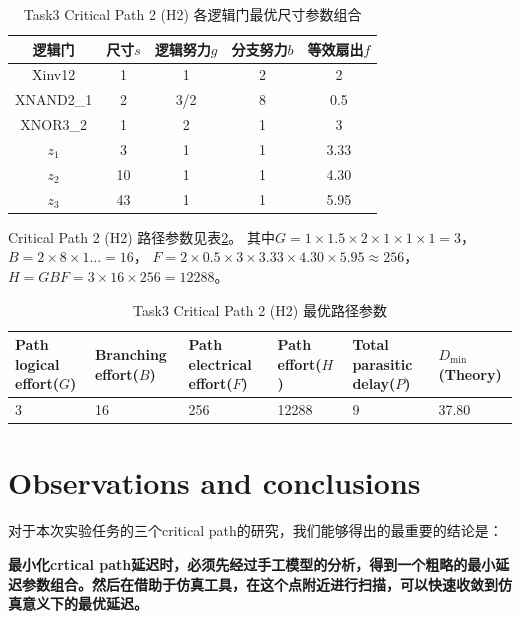 \documentclass[UTF8,12pt,a4paper]{ctexart}
\begin{document}
\begin{table}[htbp]
\centering
\caption{Task3 Critical Path 2 (H2) 各逻辑门最优尺寸参数组合}
\label{tab:task3_h2_best_gate_params}
\begin{tabular}{ccccc}
\toprule
逻辑门 & 尺寸$s$ & 逻辑努力$g$ & 分支努力$b$ & 等效扇出$f$ \\
\midrule
Xinv12    & 1 & 1 & 2 & 2 \\
XNAND2\_1 & 2 & 3/2 & 8 & 0.5 \\
XNOR3\_2  & 1 & 2 & 1 & 3 \\
$z_1$     & 3 & 1 & 1 & 3.33 \\
$z_2$     & 10 & 1 & 1 & 4.30 \\
$z_3$     & 43 & 1 & 1 & 5.95 \\
\bottomrule
\end{tabular}
\end{table}

Critical Path 2 (H2) 路径参数见表\ref{tab:task3_h2_best_path_params}。
其中$G = 1 \times 1.5 \times 2 \times 1 \times 1 \times 1 = 3$，$B = 2 \times 8 \times 1 \dots = 16$，
$F = 2 \times 0.5 \times 3 \times 3.33 \times 4.30 \times 5.95 \approx 256$，
$H = GBF = 3 \times 16 \times 256 = 12288$。

\begin{table}[htbp]
    \centering
    \caption{Task3 Critical Path 2 (H2) 最优路径参数}
    \label{tab:task3_h2_best_path_params}
    \begin{tabularx}{\linewidth}{XXXXXX}
    \toprule
    Path logical effort($G$) & Branching effort($B$) &
    Path electrical effort($F$) & Path effort($H$) &
    Total parasitic delay($P$) & $D_{\text{min}}$(Theory) \\
    \midrule
    3 & 16 & 256 & 12288 & 9 & 37.80 \\
    \bottomrule
    \end{tabularx}
\end{table}


\section{Observations and conclusions}

对于本次实验任务的三个critical path的研究，我们能够得出的最重要的结论是：

\textbf{最小化crtical path延迟时，必须先经过手工模型的分析，得到一个粗略的最小延迟参数组合。然后在借助于仿真工具，在这个点附近进行扫描，可以快速收敛到仿真意义下的最优延迟。}
\end{document}
